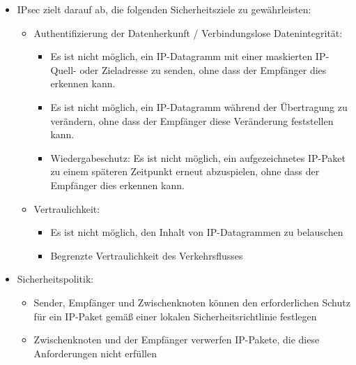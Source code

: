 \documentclass[a4paper]{article}
\begin{document}
\begin{multicols}{3}
    \begin{itemize}
        \item
              IPsec zielt darauf ab, die folgenden Sicherheitsziele zu
              gewährleisten:

              \begin{itemize}
                  \item
                        Authentifizierung der Datenherkunft / Verbindungslose
                        Datenintegrität:

                        \begin{itemize}
                            \item
                                  Es ist nicht möglich, ein IP-Datagramm mit einer maskierten
                                  IP-Quell- oder Zieladresse zu senden, ohne dass der Empfänger dies
                                  erkennen kann.
                            \item
                                  Es ist nicht möglich, ein IP-Datagramm während der Übertragung zu
                                  verändern, ohne dass der Empfänger diese Veränderung feststellen
                                  kann.
                            \item
                                  Wiedergabeschutz: Es ist nicht möglich, ein aufgezeichnetes
                                  IP-Paket zu einem späteren Zeitpunkt erneut abzuspielen, ohne dass
                                  der Empfänger dies erkennen kann.
                        \end{itemize}
                  \item
                        Vertraulichkeit:

                        \begin{itemize}
                            \item
                                  Es ist nicht möglich, den Inhalt von IP-Datagrammen zu belauschen
                            \item
                                  Begrenzte Vertraulichkeit des Verkehrsflusses
                        \end{itemize}
              \end{itemize}
        \item
              Sicherheitspolitik:

              \begin{itemize}
                  \item
                        Sender, Empfänger und Zwischenknoten können den erforderlichen
                        Schutz für ein IP-Paket gemäß einer lokalen Sicherheitsrichtlinie
                        festlegen
                  \item
                        Zwischenknoten und der Empfänger verwerfen IP-Pakete, die diese
                        Anforderungen nicht erfüllen
              \end{itemize}
    \end{itemize}



\end{multicols}
\end{document}
